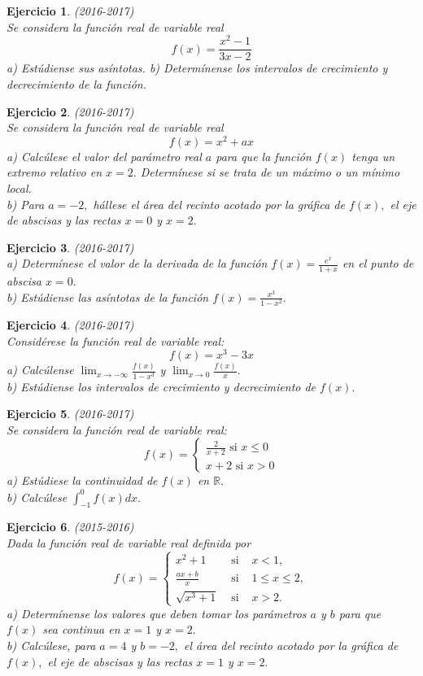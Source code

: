 \documentclass[12pt, a4paper]{amsart}
\newtheorem{ejer}{Ejercicio}
\begin{document}
\begin{ejer}\em (2016-2017)\\
Se considera la función real de variable real
\[f(x)=\frac{x^2-1}{3x-2}\]
a) Estúdiense sus asíntotas.
b) Determínense los intervalos de crecimiento y decrecimiento de la función.
\end{ejer}

\begin{ejer}\em (2016-2017)\\
Se considera la función real de variable real
\[f(x)=x^2+ax\]
a) Calcúlese el valor del parámetro real $a$ para que la función $f (x)$ tenga un extremo relativo en $x = 2.$ Determínese si se trata de un máximo o un mínimo local.\\
b) Para $a = - 2,$ hállese el área del recinto acotado por la gráfica de $f(x),$ el eje de abscisas y las rectas $x = 0$ y $x = 2.$
\end{ejer}

\begin{ejer}\em (2016-2017)\\
a) Determínese el valor de la derivada de la función $f (x) =\frac{e^x}{1+x}$ en el punto de abscisa $x=0.$\\
b) Estúdiense las asíntotas de la función $f (x) =\frac{x^3}{1-x^2}.$
\end{ejer}

\begin{ejer}\em (2016-2017)\\
Considérese la función real de variable real:
\[f(x)=x^3-3x\]
a) Calcúlense $\lim_{x\to -\infty}\frac{f(x)}{1-x^3}$ y $\lim_{x\to 0} \frac{f(x)}{x}.$\\
b) Estúdiense los intervalos de crecimiento y decrecimiento de $f (x).$
\end{ejer}

\begin{ejer}\em (2016-2017)\\
Se considera la función real de variable real:
\[f(x)=\left \{ \begin{matrix}
\frac{2}{x+2} \text{ si } x\leq 0\\
x+2\text{ si } x>0
\end{matrix}\right.\]
a) Estúdiese la continuidad de $f (x)$ en $\mathbb{R}.$\\
b) Calcúlese $\int_{-1}^0f(x)dx.$
\end{ejer}

\begin{ejer}\em (2015-2016)\\
Dada la función real de variable real definida por
\[f(x)=\left \{ \begin{matrix}
x^2+1 & \text{ si } & x<1,\\
\frac{ax+b}{x} & \text{ si } & 1\leq x\leq 2,\\
\sqrt{x^3+1} & \text{ si } &x>2.
\end{matrix}\right.\]
a) Determínense los valores que deben tomar los parámetros $a$ y $b$ para que $f (x)$ sea continua en $x = 1$ y $x = 2.$\\
b) Calcúlese, para $a = 4$ y $b = - 2,$ el área del recinto acotado por la gráfica de $f(x),$ el eje de abscisas y las rectas $x = 1$ y $x = 2.$
\end{ejer}
\end{document}
